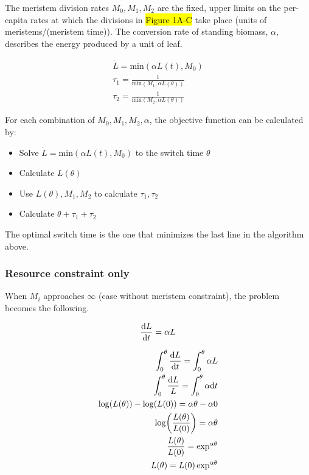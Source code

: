 \documentclass[12pt, oneside]{article}   	%
\begin{document}
The meristem division rates $M_0, M_1, M_2$ are the fixed, upper limits on the per-capita rates at which the divisions in \hl{Figure 1A-C} take place (units of meristems/(meristem time)). The conversion rate of standing biomass, $\alpha$, describes the energy produced by a unit of leaf.

\begin{align}
\dot{L} = \mathrm{min}(\alpha L(t), M_0) \nonumber \\
\tau_1 = \frac{1}{\mathrm{min}(M_1,\alpha L(\theta) )} \nonumber \\ 
\tau_2 = \frac{1}{\mathrm{min}(M_2,\alpha L(\theta) )} \nonumber
\end{align}

For each combination of $M_0, M_1, M_2, \alpha$, the objective function can be calculated by:

\begin{itemize}
\item Solve $\dot{L} = \mathrm{min}(\alpha L(t), M_0)$ to the switch time $\theta$
\item Calculate $L(\theta)$
\item Use $L(\theta), M_1, M_2$ to calculate $\tau_1, \tau_2$
\item Calculate $\theta + \tau_1 + \tau_2  \nonumber$
\end{itemize}

The optimal switch time is the one that minimizes the last line in the algorithm above.

\subsubsection{Resource constraint only}
When $M_i$ approaches $\infty$ (case without meristem constraint), the problem becomes the following. 

\begin{align}
\dv{L}{t} = \alpha L \nonumber
\end{align}

\begin{align}
\int_{0}^{\theta} \dv{L}{t} =\int_{0}^{\theta} \alpha L \nonumber \\
\int_{0}^{\theta} \frac{\mathrm{d}L}{L} =\int_{0}^{\theta} \alpha \mathrm{d}t \nonumber \\
\log(L(\theta)) - \log(L(0)) = \alpha \theta - \alpha 0 \nonumber \\
\log(\frac{L(\theta)}{L(0)}) = \alpha \theta \nonumber \\
\frac{L(\theta)}{L(0)} = \exp^{\alpha \theta} \nonumber \\
L(\theta) = L(0) \exp^{\alpha \theta} \nonumber 
\end{align}
\end{document}
